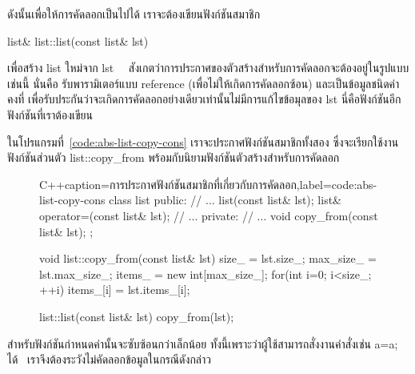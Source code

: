 ดังนั้น{\wbr}เพื่อให้{\wbr}การ{\wbr}คัดลอก{\wbr}เป็น{\wbr}ไป{\wbr}ได้ เรา{\wbr}จะ{\wbr}ต้อง{\wbr}เขียน{\wbr}ฟังก์ชัน{\wbr}สมาชิก{\wbr}
\begin{center}
{\ct list\& list::list(const list\& lst)}
\end{center}
เพื่อ{\wbr}สร้าง {\ct list} ใหม่{\wbr}จาก {\ct lst}
\ \ สังเกต{\wbr}ว่า{\wbr}การ{\wbr}ประกาศ{\wbr}ของ{\wbr}ตัว{\wbr}สร้าง{\wbr}สำหรับ{\wbr}การ{\wbr}คัดลอก{\wbr}จะ{\wbr}ต้อง{\wbr}อยู่{\wbr}ใน{\wbr}รูปแบบ{\wbr}เช่นนี้ นั่น{\wbr}คือ{\wbr}
รับ{\wbr}พารามิเตอร์{\wbr}แบบ reference (เพื่อ{\wbr}ไม่{\wbr}ให้{\wbr}เกิด{\wbr}การ{\wbr}คัดลอก{\wbr}ซ้อน) และ{\wbr}เป็น{\wbr}ข้อมูล{\wbr}ชนิด{\wbr}ค่าคงที่{\wbr}
เพื่อ{\wbr}รับประกัน{\wbr}ว่า{\wbr}จะ{\wbr}เกิด{\wbr}การ{\wbr}คัดลอก{\wbr}อย่างเดียว{\wbr}เท่านั้น{\wbr}ไม่{\wbr}มี{\wbr}การ{\wbr}แก้ไข{\wbr}ข้อ{\wbr}มุ{\wbr}ล{\wbr}ของ {\ct lst}
นี่{\wbr}คือ{\wbr}ฟังก์ชัน{\wbr}อีก{\wbr}ฟังก์ชัน{\wbr}ที่{\wbr}เรา{\wbr}ต้อง{\wbr}เขียน{\wbr}

ใน{\wbr}โปรแกรม{\wbr}ที่~\ref{code:abs-list-copy-cons}
เรา{\wbr}จะ{\wbr}ประกาศ{\wbr}ฟังก์ชัน{\wbr}สมาชิก{\wbr}ทั้ง{\wbr}สอง ซึ่ง{\wbr}จะ{\wbr}เรียก{\wbr}ใช้{\wbr}งาน{\wbr}ฟังก์ชัน{\wbr}ส่วนตัว {\ct
  list::copy\_from} พร้อมกับ{\wbr}นิยาม{\wbr}ฟังก์ชัน{\wbr}ตัว{\wbr}สร้าง{\wbr}สำหรับ{\wbr}การ{\wbr}คัดลอก{\wbr}

\begin{figure}
\latintext
\begin{codelist}{C++}{caption={\thaitext การ{\wbr}ประกาศ{\wbr}ฟังก์ชัน{\wbr}สมาชิก{\wbr}ที่{\wbr}เกี่ยวกับ{\wbr}การ{\wbr}คัดลอก\latintext},label=code:abs-list-copy-cons}
class list {
public:
  // ...
  list(const list& lst);
  list& operator=(const list& lst);
  // ...
private:
  // ...
  void copy_from(const list& lst);
};

void list::copy_from(const list& lst)
{
  size_ = lst.size_;
  max_size_ = lst.max_size_;
  items_ = new int[max_size_];
  for(int i=0; i<size_; ++i)
    items_[i] = lst.items_[i];
}

list::list(const list& lst)
{
  copy_from(lst);
}
\end{codelist}
\thaitext
\end{figure}

สำหรับ{\wbr}ฟังก์ชัน{\wbr}กำหนด{\wbr}ค่า{\wbr}นั้น{\wbr}จะ{\wbr}ซับซ้อน{\wbr}กว่า{\wbr}เล็กน้อย{\wbr}
ทั้งนี้เพราะ{\wbr}ว่า{\wbr}ผู้ใช้{\wbr}สามารถ{\wbr}สั่ง{\wbr}งาน{\wbr}คำสั่ง{\wbr}เช่น {\ct a=a;} ได้{\wbr}
\ เรา{\wbr}จึง{\wbr}ต้อง{\wbr}ระวัง{\wbr}ไม่{\wbr}คัดลอก{\wbr}ข้อมูล{\wbr}ใน{\wbr}กรณี{\wbr}ดังกล่าว{\wbr}

